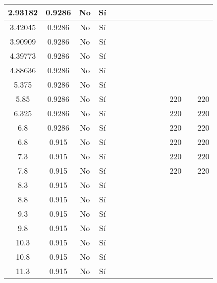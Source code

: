 \begin{table}[H]
{\begin{tabular}{|c|c|c|c|c|c|c|c|c|c|c|c|c|c|}
\hline
2.93182 & 0.9286 & No  & Sí  &     &     &     &     &     &     &     &     &     &  \bigstrut\\
\hline
3.42045 & 0.9286 & No  & Sí  &     &     &     &     &     &     &     &     &     &  \bigstrut\\
\hline
3.90909 & 0.9286 & No  & Sí  &     &     &     &     &     &     &     &     &     &  \bigstrut\\
\hline
4.39773 & 0.9286 & No  & Sí  &     &     &     &     &     &     &     &     &     &  \bigstrut\\
\hline
4.88636 & 0.9286 & No  & Sí  &     &     &     &     &     &     &     &     &     &  \bigstrut\\
\hline
5.375 & 0.9286 & No  & Sí  &     &     &     &     &     &     &     &     &     &  \bigstrut\\
\hline
5.85 & 0.9286 & No  & Sí  &     &     &     &     &     &     &     & 220 &     & 220 \bigstrut\\
\hline
6.325 & 0.9286 & No  & Sí  &     &     &     &     &     &     &     & 220 &     & 220 \bigstrut\\
\hline
6.8 & 0.9286 & No  & Sí  &     &     &     &     &     &     &     & 220 &     & 220 \bigstrut\\
\hline
6.8 & 0.915 & No  & Sí  &     &     &     &     &     &     &     & 220 &     & 220 \bigstrut\\
\hline
7.3 & 0.915 & No  & Sí  &     &     &     &     &     &     &     & 220 &     & 220 \bigstrut\\
\hline
7.8 & 0.915 & No  & Sí  &     &     &     &     &     &     &     & 220 &     & 220 \bigstrut\\
\hline
8.3 & 0.915 & No  & Sí  &     &     &     &     &     &     &     &     &     &  \bigstrut\\
\hline
8.8 & 0.915 & No  & Sí  &     &     &     &     &     &     &     &     &     &  \bigstrut\\
\hline
9.3 & 0.915 & No  & Sí  &     &     &     &     &     &     &     &     &     &  \bigstrut\\
\hline
9.8 & 0.915 & No  & Sí  &     &     &     &     &     &     &     &     &     &  \bigstrut\\
\hline
10.3 & 0.915 & No  & Sí  &     &     &     &     &     &     &     &     &     &  \bigstrut\\
\hline
10.8 & 0.915 & No  & Sí  &     &     &     &     &     &     &     &     &     &  \bigstrut\\
\hline
11.3 & 0.915 & No  & Sí  &     &     &     &     &     &     &     &     &     &  \bigstrut\\

\end{tabular}}
\end{table}
